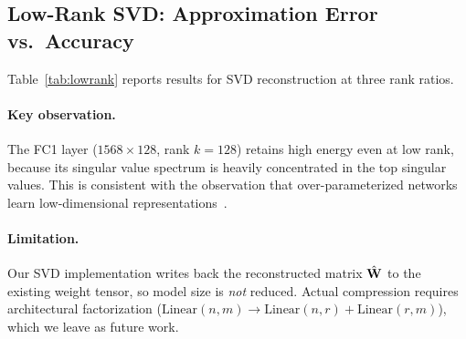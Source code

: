 \subsection{Low-Rank SVD: Approximation Error vs.\ Accuracy}
\label{sec:lowrank_results}

Table~\ref{tab:lowrank} reports results for SVD reconstruction
at three rank ratios.

\begin{table}[ht]
\centering
\caption{Low-rank SVD results.
$\eta$: mean energy retained (Eq.~\ref{eq:energy}).
Frob.\ err: relative Frobenius approximation error.
Note: model size is unchanged (reconstruction, not factorization).}
\label{tab:lowrank}
\small
{}
\end{table}

\paragraph{Key observation.}
The FC1 layer ($1568 \times 128$, rank $k=128$) retains high energy
even at low rank, because its singular value spectrum is heavily
concentrated in the top singular values.
This is consistent with the observation that over-parameterized
networks learn low-dimensional representations~\citep{li2018constrained}.

\paragraph{Limitation.}
Our SVD implementation writes back the reconstructed matrix
$\hat{\mathbf{W}}$ to the existing weight tensor, so model size is \emph{not}
reduced.
Actual compression requires architectural factorization
($\text{Linear}(n,m) \to \text{Linear}(n,r) + \text{Linear}(r,m)$),
which we leave as future work.
